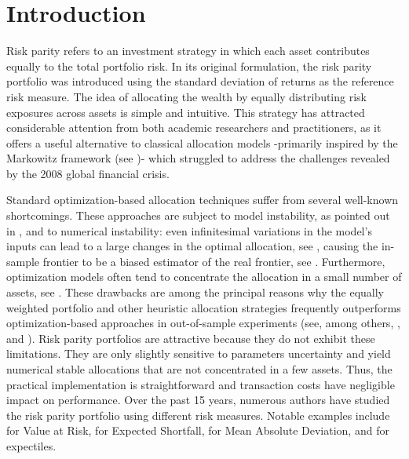 \documentclass[preprint,11pt,authoryear]{elsarticle}
\begin{document}
\section{Introduction}


Risk parity refers to an investment strategy in which each asset contributes equally to the total portfolio risk. In its original formulation, the risk parity portfolio was introduced using the standard deviation of returns as the reference risk measure. The idea of allocating the wealth by equally distributing risk exposures across assets is simple and intuitive. This strategy has attracted considerable attention from both academic researchers and practitioners, as it offers a useful alternative to classical allocation models -primarily inspired by the Markowitz framework (see \cite{M})- which struggled to address the challenges revealed by the 2008 global financial crisis.

Standard optimization-based allocation techniques suffer from several well-known shortcomings. These approaches are subject to model instability, as pointed out in \cite{kan2007optimal}, and to numerical instability: even infinitesimal variations in the model’s inputs can lead to a large changes in the optimal allocation, see \cite{best1991sensitivity}, causing the in-sample frontier to be a biased estimator of the real frontier, see \cite{kan2008distribution}. Furthermore, optimization models often tend to concentrate the allocation in a small number of assets, see \cite{yanushevsky2015approach}. These drawbacks are among the principal reasons why the equally weighted portfolio and other heuristic allocation strategies frequently outperforms optimization-based approaches in out-of-sample experiments (see, among others, \cite{demiguel2009optimal}, \cite{yuan2024naive} and \cite{gelmini2024equally}). Risk parity portfolios are attractive because they do not exhibit these limitations. They are only slightly sensitive to parameters uncertainty and yield numerical stable allocations that are not concentrated in a few assets. Thus, the practical implementation is straightforward and transaction costs have negligible impact on performance. Over the past 15 years, numerous authors have studied the risk parity portfolio using different risk measures. Notable examples include \cite{hallerbach1999decomposing} for Value at Risk, \cite{mausser2018long} for Expected Shortfall, \cite{ararat2024mad} for Mean Absolute Deviation, and \cite{bellini2021risk} for expectiles.
\end{document}

